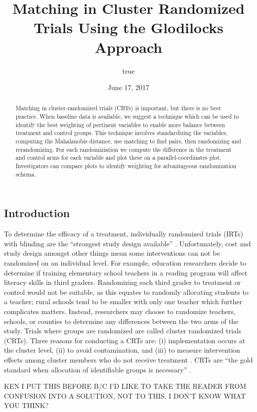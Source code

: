 \documentclass[]{sagej}
\title{Matching in Cluster Randomized Trials Using the Glodilocks Approach}
\author{true}
\date{June 17, 2017}
\begin{document}
\maketitle
\begin{abstract}
Matching in cluster-randomized trials (CRTs) is important, but there is
no best practice. When baseline data is available, we suggest a
technique which can be used to identify the best weighting of pertinent
variables to enable more balance between treatment and control groups.
This technique involves standardizing the variables, computing the
Mahalanobis distance, use matching to find pairs, then randomizing and
rerandomizing. For each randomiziation we compute the difference in the
treatment and control arms for each variable and plot these on a
parallel-coordinates plot. Investigators can compare plots to identify
weighting for advantageous randomization schema.
\end{abstract}

\subsection{Introduction}\label{introduction}

To determine the efficacy of a treatment, individually randomized trials
(IRTs) with blinding are the ``strongest study design available''
\citep{gatsonis2017methods}. Unfortunately, cost and study design
amongst other things mean some interventions can not be randomized on an
individual level. For example, education researchers decide to determine
if training elementary school teachers in a reading program will affect
literacy skills in third graders. Randomizing each third grader to
treatment or control would not be suitable, as this equates to randomly
allocating students to a teacher; rural schools tend to be smaller with
only one teacher which further complicates matters. Instead, researchers
may choose to randomize teachers, schools, or counties to determine any
differences between the two arms of the study. Trials where groups are
randomized are called cluster randomized trials (CRTs). Three reasons
for conducting a CRTs are: (i) implementation occurs at the cluster
level, (ii) to avoid contamination, and (iii) to measure intervention
effects among cluster members who do not receive treatment
\citep{balzer2012match, CRTrials2009}. CRTs are ``the gold standard when
allocation of identifiable groups is necessary''
\citep{murray2004design}.

KEN I PUT THIS BEFORE B/C I'D LIKE TO TAKE THE READER FROM CONFUSION
INTO A SOLUTION, NOT TO THIS. I DON'T KNOW WHAT YOU THINK?
\end{document}

